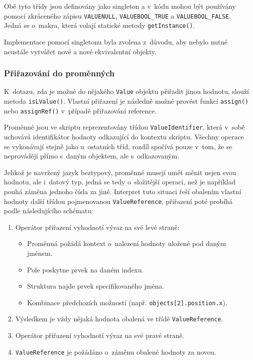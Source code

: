 \documentclass[11pt,twoside,a4paper]{book}
\begin{document}
Obě tyto třídy jsou definovány jako singleton a v~kódu mohou být používány pomocí zkrá\-ce\-né\-ho zápisu \texttt{VALUENULL}, \texttt{VALUEBOOL\_TRUE} a \texttt{VALUEBOOL\_FALSE}. Jedná se o~makra, která volají statické metody \texttt{getInstance()}.

Implementace pomocí singletonu byla zvolena z~důvodu, aby nebylo nutné neustále vytvářet nové a nové ekvivalentní objekty.


\subsubsection{Přiřazování do proměnných}
\label{valuereference_a_prirazovani_do_promennych}

K~dotazu, zda je možné do nějakého \texttt{Value} objektu přiřadit jinou hodnotu, slouží metoda \texttt{isLValue()}. Vlastní přiřazení je následně možné provést funkcí \texttt{assign()} nebo \texttt{assignRef()} v~případě přiřazování reference.

Proměnné jsou ve skriptu reprezentovány třídou \texttt{ValueIdentifier}, která v~sobě u\-cho\-vá\-vá identifikátor hodnoty odkazující do kontextu skriptu. Všechny operace se vykonávají stejně jako u~ostatních tříd, rozdíl spočívá pouze v~tom, že se neprovádějí přímo s~daným objektem, ale s~odkazovaným.

Jelikož je navržený jazyk beztypový, proměnné musejí umět měnit nejen svou hodnotu, ale i~datový typ, jedná se tedy o~složitější operaci, než je například pouhá záměna jednoho čísla za jiné. Interpret tuto situaci řeší obalením vlastní hodnoty další třídou pojmenovanou \texttt{ValueReference}, přiřazení poté probíhá podle následujícího schématu:

\begin{enumerate}
\item Operátor přiřazení vyhodnotí výraz na své levé straně:
	\begin{itemize}
	\item Proměnná požádá kontext o~nalezení hodnoty uložené pod daným jménem.
	\item Pole poskytne prvek na daném indexu.
	\item Struktura najde prvek specifikovaného jména.
	\item Kombinace předchozích možností (např. \texttt{objects[2].position.x}).
	\end{itemize}
\item Výsledkem je vždy nějaká hodnota obalená ve třídě \texttt{ValueReference}.
\item Operátor přiřazení vyhodnotí výraz na své pravé straně.
\item \texttt{ValueReference} je požádáno o~záměnu obalené hodnoty za novou.
\end{enumerate}
\end{document}
